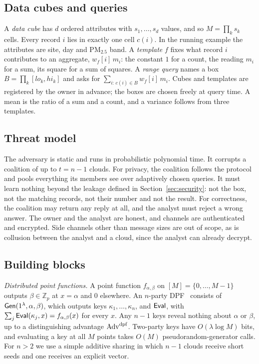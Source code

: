 \documentclass[10pt,journal,compsoc]{IEEEtran}
\begin{document}
\subsection{Data cubes and queries}
A \emph{data cube} has $d$ ordered attributes with $s_1,\dots,s_d$ values, and
so $M=\prod_k s_k$ cells. Every record $i$ lies in exactly one cell $c(i)$. In
the running example the attributes are site, day and PM$_{2.5}$ band. A
\emph{template} $f$ fixes what record $i$ contributes to an aggregate,
$w_f[i]\,m_i$: the constant $1$ for a count, the reading $m_i$ for a sum, its
square for a sum of squares. A \emph{range query} names a box
$B=\prod_k[\mathit{lo}_k,\mathit{hi}_k]$ and asks for
$\sum_{i:\,c(i)\in B}w_f[i]\,m_i$. Cubes and templates are registered by the
owner in advance; the boxes are chosen freely at query time. A mean is the
ratio of a sum and a count, and a variance follows from three templates.

\subsection{Threat model}
The adversary is static and runs in probabilistic polynomial time. It corrupts
a coalition of up to $t=n-1$ clouds. For privacy, the coalition follows the
protocol and pools everything its members see over adaptively chosen queries.
It must learn nothing beyond the leakage defined in Section~\ref{sec:security}:
not the box, not the matching records, not their number and not the result.
For correctness, the coalition may return any reply at all, and the analyst
must reject a wrong answer. The owner and the analyst are honest, and channels
are authenticated and encrypted. Side channels other than message sizes are
out of scope, as is collusion between the analyst and a cloud, since the
analyst can already decrypt.

\subsection{Building blocks}
\emph{Distributed point functions.} A point function $f_{\alpha,\beta}$ on
$[M]=\{0,\dots,M-1\}$ outputs $\beta\in\mathbb{Z}_p$ at $x=\alpha$ and $0$
elsewhere. An $n$-party DPF~\cite{gilboa2014distributed,boyle2015function,boyle2016function}
consists of $\mathsf{Gen}(1^\lambda,\alpha,\beta)$, which outputs keys
$\kappa_1,\dots,\kappa_n$, and $\mathsf{Eval}$, with
$\sum_j\mathsf{Eval}(\kappa_j,x)=f_{\alpha,\beta}(x)$ for every $x$. Any $n-1$ keys
reveal nothing about $\alpha$ or $\beta$, up to a distinguishing advantage
$\mathrm{Adv}^{\mathrm{dpf}}$. Two-party keys have $O(\lambda\log M)$ bits, and evaluating a key at
all $M$ points takes $O(M)$ pseudorandom-generator calls. For $n>2$ we use a
simple additive sharing in which $n-1$ clouds receive short seeds and one
receives an explicit vector.
\end{document}
